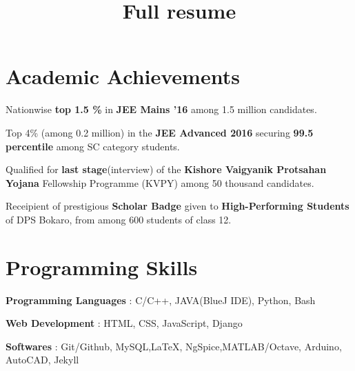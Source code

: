 \documentclass[11pt]{resume}
\title{Full resume}
\begin{document}
\vspace*{20mm}
\vspace{-2em}
\begin{resume}
\section{\mysidestyle Academic Achievements}
\begin{list2}
\item Nationwise \textbf{top 1.5 \% } in \textbf{JEE Mains '16} among 1.5 million candidates.
\item Top 4\% (among 0.2 million) in the \textbf{JEE Advanced 2016} securing \textbf{99.5 percentile} among SC 	category students. 
\item  Qualified for \textbf{last stage}(interview) of the \textbf{Kishore Vaigyanik Protsahan Yojana} Fellowship Programme (KVPY)  among 50 thousand candidates.
\item Receipient of prestigious \textbf{Scholar Badge} given to \textbf{High-Performing Students} of DPS Bokaro, from among 600 students of class 12.  
\end{list2}

\section{\mysidestyle Programming Skills}
\begin{list2}
\item \indent\textbf{Programming Languages} : C/C++, JAVA(BlueJ IDE), Python, Bash
\item \indent\textbf{Web Development} : HTML, CSS, JavaScript, Django
\item \indent\textbf{Softwares} : Git/Github, MySQL,\LaTeX, NgSpice,MATLAB/Octave, Arduino, AutoCAD, Jekyll
\end{list2}


\end{resume}
\end{document}

